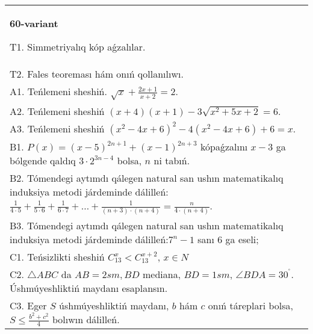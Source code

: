 \documentclass{article}
\begin{document}
\begin{tabular}{m{17cm}}
\textbf{60-variant}
\newline

T1. Simmetriyalıq kóp aǵzalılar. \\
T2. Fales teoreması hám onıń qollanılıwı. \\
A1. Teńlemeni sheshiń. \(\sqrt{x} + \frac{2x + 1}{x + 2} = 2\). \\
A2. Teńlemeni sheshiń \((x + 4)(x + 1) - 3\sqrt{x^{2} + 5x + 2} = 6\). \\
A3. Teńlemeni sheshiń \(\left( x^{2} - 4x + 6 \right)^{2} - 4\left( x^{2} - 4x + 6 \right) + 6 = x\). \\
B1. \(P(x) = (x - 5)^{2n + 1} + (x - 1)^{2n + 3}\) kópaǵzalını \(x - 3\) ga bólgende qaldıq \(3 \cdot 2^{3n - 4}\) bolsa, \(n\) ni tabıń. \\
B2. Tómendegi aytımdı qálegen natural san ushın matematikalıq induksiya metodi járdeminde dálilleń: \(\frac{1}{4 \cdot 5} + \frac{1}{5 \cdot 6} + \frac{1}{6 \cdot 7} + \ldots + \frac{1}{(n + 3) \cdot (n + 4)} = \frac{n}{4 \cdot (n + 4)}\). \\
B3. Tómendegi aytımdı qálegen natural san ushın matematikalıq induksiya metodi járdeminde dálilleń:\(7^{n} - 1\) sanı 6 ga eseli; \\
C1. Teńsizlikti sheshiń \(C_{13}^{x} < C_{13}^{x + 2}\), \(x \in N\) \\
C2. \(\bigtriangleup ABC\) da \(AB = 2sm,BD\) mediana, \(BD = 1sm\), \(\angle BDA = 30^{{^\circ}}\). Úshmúyeshliktiń maydanı esaplansın. \\
C3. Eger \(S\) úshmúyeshliktiń maydanı, \(b\) hám \(c\) onıń táreplari bolsa, \(S \leq \frac{b^{2} + c^{2}}{4}\) bolıwın dálilleń. \\

\end{tabular}
\vspace{1cm}
\end{document}
